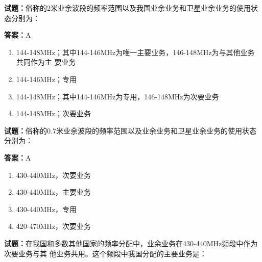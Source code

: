 \documentclass{ctexbook}
\begin{document}




\vspace{1em}

\textbf{试题：}俗称的2米业余波段的频率范围以及我国业余业务和卫星业余业务的使用状态分别为： 

\textbf{答案：}A 

\begin{enumerate}[leftmargin=3em]
  \item 144-148MHz；其中144-146MHz为唯一主要业务，146-148MHz为与其他业务共同作为主
要业务 

  \item 144-146MHz；专用 

  \item 144-148MHz；其中144-146MHz为专用，146-148MHz为次要业务 

  \item 144-148MHz；次要业务 

\end{enumerate}





\vspace{1em}

\textbf{试题：}俗称的0.7米业余波段的频率范围以及业余业务和卫星业余业务的使用状态分别为： 

\textbf{答案：}A 

\begin{enumerate}[leftmargin=3em]
  \item 430-440MHz，次要业务 

  \item 430-440MHz，主要业务 

  \item 430-440MHz，专用 

  \item 420-470MHz，次要业务 

\end{enumerate}






\vspace{1em}

\textbf{试题：}在我国和多数其他国家的频率分配中，业余业务在430-440MHz频段中作为次要业务与其
他业务共用。这个频段中我国分配的主要业务是： 
\end{document}
